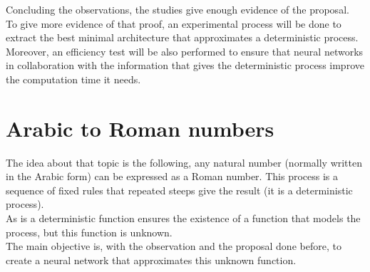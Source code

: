 \documentclass[a4paper, 11pt]{article}
\begin{document}
Concluding the observations, the studies give enough evidence of the proposal.\\
To give more evidence of that proof, an experimental process will be done to extract the best minimal architecture that approximates a deterministic process.\\
Moreover, an efficiency test will be also performed to ensure that neural networks in collaboration with the information that gives the deterministic process improve the computation time it needs.

\section{Arabic to Roman numbers}
The idea about that topic is the following, any natural number (normally written in the Arabic form) can be expressed as a Roman number. This process is a sequence of fixed rules that repeated steeps give the result (it is a deterministic process).\\
As is a deterministic function ensures the existence of a function that models the process, but this function is unknown.\\
The main objective is, with the observation and the proposal done before, to create a neural network that approximates this unknown function.
\end{document}

